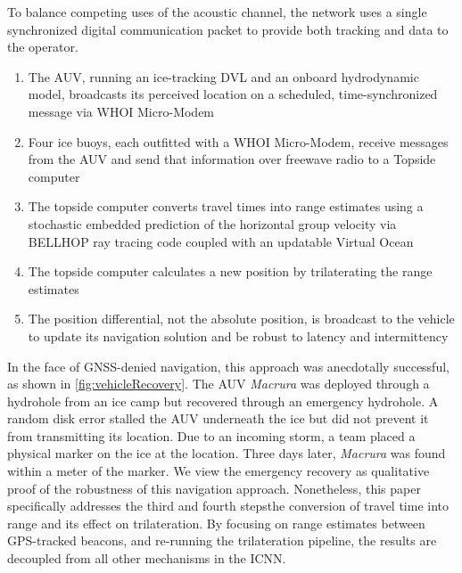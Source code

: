To balance competing uses of the acoustic channel, the network uses a single synchronized digital communication packet to provide both tracking and data to the operator.
\begin{enumerate}
\item The AUV, running an ice-tracking DVL and an onboard hydrodynamic model, broadcasts its perceived location on a scheduled, time-synchronized message via WHOI Micro-Modem
\item Four ice buoys, each outfitted with a WHOI Micro-Modem, receive messages from the AUV and send that information over freewave radio to a Topside computer
\item The topside computer converts travel times into range estimates using a stochastic embedded prediction of the horizontal group velocity via BELLHOP ray tracing code \citep{porter_bellhop_2011} coupled with an updatable Virtual Ocean \citep{schneider_netsim_2018,bhatt_embedded_2021}
\item The topside computer calculates a new position by trilaterating the range estimates
\item The position differential, not the absolute position, is broadcast to the vehicle to update its navigation solution and be robust to latency and intermittency
\end{enumerate}

In the face of GNSS-denied navigation, this approach was anecdotally successful, as shown in \ref{fig:vehicleRecovery}.
The AUV \emph{Macrura} was deployed through a hydrohole from an ice camp but recovered through an emergency hydrohole.
A random disk error stalled the AUV underneath the ice but did not prevent it from transmitting its location.
Due to an incoming storm, a team placed a physical marker on the ice at the location.
Three days later, \emph{Macrura} was found within a meter of the marker.
We view the emergency recovery as qualitative proof of the robustness of this navigation approach.
Nonetheless, this paper specifically addresses the third and fourth steps\textemdash the conversion of travel time into range and its effect on trilateration.
By focusing on range estimates between GPS-tracked beacons, and re-running the trilateration pipeline, the results are decoupled from all other mechanisms in the ICNN.

